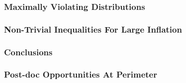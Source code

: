 \documentclass[
    hyperref={colorlinks=true, linkcolor=blue, urlcolor=blue, citecolor=MidnightBlue},
    xcolor={dvipsnames},
]{beamer}
\begin{document}
\begin{frame}
    \frametitle{Maximally Violating Distributions}
\end{frame}

\begin{frame}
    \frametitle{Non-Trivial Inequalities For Large Inflation}
\end{frame}

\begin{frame}
    \frametitle{Conclusions}
\end{frame}

\begin{frame}
    \frametitle{Post-doc Opportunities At Perimeter}
\end{frame}
\end{document}
